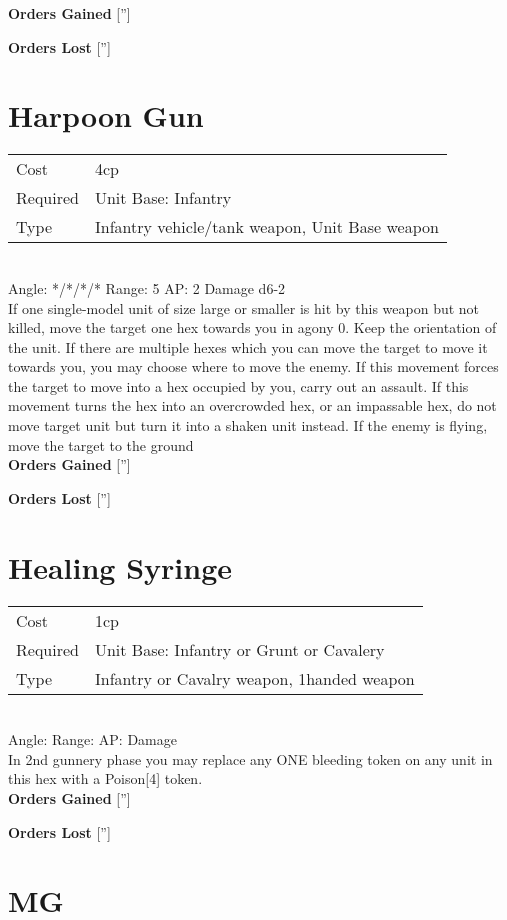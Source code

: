 {\bf Orders Gained}
['']

{\bf Orders Lost}
['']
\section{ Harpoon Gun }

\begin{tabular}{ll}
    Cost & 4cp \\
    Required & Unit Base: Infantry\\
    Type & Infantry vehicle/tank weapon, Unit Base weapon\\
\end{tabular}
\ \\
\indent Angle: */*/*/* Range: 5  AP: 2 Damage d6-2 \\
If one single-model unit of size large or smaller is hit by this weapon but not killed, move the target one hex towards you in agony 0. Keep the orientation of the unit. If there are multiple hexes which you can move the target to move it towards you, you may choose where to move the enemy. If this movement forces the target to move into a hex occupied by you, carry out an assault. If this movement turns the hex into an overcrowded hex, or an impassable hex, do not move target unit but turn it into a shaken unit instead. If the enemy is flying, move the target to the ground
\ \\

{\bf Orders Gained}
['']

{\bf Orders Lost}
['']
\section{ Healing Syringe }

\begin{tabular}{ll}
    Cost & 1cp \\
    Required & Unit Base: Infantry or Grunt or Cavalery\\
    Type & Infantry or Cavalry weapon, 1handed weapon\\
\end{tabular}
\ \\
\indent Angle:  Range:   AP:  Damage  \\
In 2nd gunnery phase you may replace any ONE bleeding token on any unit in this hex with a Poison[4] token.
\ \\

{\bf Orders Gained}
['']

{\bf Orders Lost}
['']
\section{ MG }

